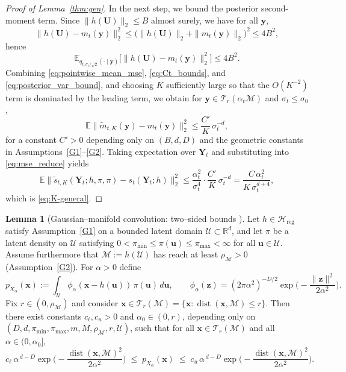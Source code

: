 \documentclass[12pt]{article}
\theoremstyle{definition} %
\newtheorem{lemma}{Lemma}
\newcommand{\R}{\mathbb{R}}
\newcommand{\M}{\mathcal{M}}
\newcommand{\Y}{\bm Y}
\newcommand{\y}{\bm y}
\newcommand{\x}{\bm x}
\newcommand{\dist}{\operatorname{dist}}
\providecommand{\E}{\mathbb{E}}
\begin{document}
\begin{proof}[Proof of Lemma~\ref{thm:gen}]
In the next step, we bound the posterior second-moment term.
Since $\|h(\bm U)\|_2\le B$ almost surely, we have for all $\y$,
\[
\|h(\bm U)-m_t(\y)\|_2^2
\le \big(\|h(\bm U)\|_2+\|m_t(\y)\|_2\big)^2
\le 4B^2,
\]
hence
\begin{equation}\label{eq:posterior_var_bound}
\E_{q_{t,\sigma_t/\sqrt2}(\cdot\mid \y)}\!\big[\|h(\bm U)-m_t(\y)\|_2^2\big]\le 4B^2.
\end{equation}
Combining \eqref{eq:pointwise_mean_mse}, \eqref{eq:Ct_bounds}, and \eqref{eq:posterior_var_bound},
and choosing $K$ sufficiently large so that the $O(K^{-2})$ term is dominated by the leading term,
we obtain for $\y\in\mathcal T_r(\alpha_t\mathcal M)$ and $\sigma_t\le\sigma_0$,
\[
\E\big\|\widetilde m_{t,K}(\y)-m_t(\y)\big\|_2^2
\le
\frac{C'}{K}\,\sigma_t^{-d},
\]
for a constant $C'>0$ depending only on $(B,d,D)$ and the geometric constants in
Assumptions~\ref{G1}--\ref{G2}.
Taking expectation over $\Y_t$ and substituting into \eqref{eq:mse_reduce} yields
\[
\E\big\|\widetilde s_{t,K}(\Y_t;h,\pi,\pi)-s_t(\Y_t;h)\big\|_2^2
\le
\frac{\alpha_t^2}{\sigma_t^4}\cdot \frac{C'}{K}\,\sigma_t^{-d}
=
\frac{C\,\alpha_t^2}{K\,\sigma_t^{d+4}},
\]
which is \eqref{eq:K-general}.
\end{proof}


\bigskip

\begin{lemma}[Gaussian--manifold convolution: two--sided bounds ]\label{lemma_gmc}
Let $h\in\mathcal H_{\mathrm{reg}}$ satisfy Assumption~\ref{G1} on a bounded latent domain
$\mathcal U\subset\R^{d}$, and let $\pi$ be a latent density on $\mathcal U$ satisfying
$0<\pi_{\min}\le \pi(\bm u)\le \pi_{\max}<\infty$ for all $\bm u\in\mathcal U$.
Assume furthermore that $\mathcal M:=h(\mathcal U)$ has reach at least $\rho_{\M}>0$
(Assumption~\ref{G2}). For $\alpha>0$ define
\[
p_{X_\alpha}(\x)
:=\int_{\mathcal U}\phi_\alpha(\x-h(\bm u))\,\pi(\bm u)\,d\bm u,
\qquad
\phi_\alpha(\bm z)
=(2\pi\alpha^2)^{-D/2}\exp\!\Big(-\frac{\|\bm z\|^2}{2\alpha^2}\Big).
\]
Fix $r\in(0,\rho_{\M})$ and consider $\x\in\mathcal T_r(\mathcal M)
=\{\x:\dist(\x,\mathcal M)\le r\}$.
Then there exist constants $c_\ell,c_u>0$ and $\alpha_0\in(0,r)$,
depending only on $(D,d,\pi_{\min},\pi_{\max},m,M,\rho_{\M},r,\mathcal U)$, such that for all
$\x\in\mathcal T_r(\mathcal M)$ and all $\alpha\in(0,\alpha_0]$,
\[
c_\ell\,\alpha^{\,d-D}
\exp\!\Big(-\frac{\dist(\x,\mathcal M)^2}{2\alpha^2}\Big)
\;\le\; p_{X_\alpha}(\x)
\;\le\;
c_u\,\alpha^{\,d-D}
\exp\!\Big(-\frac{\dist(\x,\mathcal M)^2}{2\alpha^2}\Big).
\]
\end{lemma}
\end{document}

